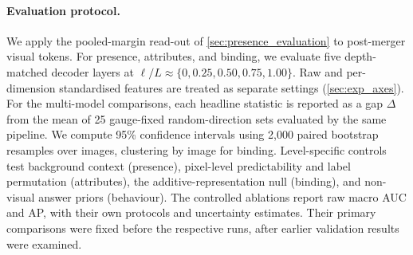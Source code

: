 \paragraph{Evaluation protocol.} We apply the pooled-margin read-out of
\cref{sec:presence_evaluation} to post-merger visual tokens. For presence,
attributes, and binding, we evaluate five depth-matched decoder layers at
$\ell/L\approx\{0,0.25,0.50,0.75,1.00\}$. Raw and per-dimension standardised
features are treated as separate settings (\cref{sec:exp_axes}). For the multi-model comparisons, each
headline statistic is reported as a gap $\Delta$ from the mean of 25
gauge-fixed random-direction sets evaluated by the same pipeline. We compute
95\% confidence intervals using 2,000 paired bootstrap resamples over images,
clustering by image for binding. Level-specific controls test background
context (presence), pixel-level predictability and label permutation
(attributes), the additive-representation null (binding), and non-visual
answer priors (behaviour). The controlled ablations report raw macro AUC and AP, with their own
protocols and uncertainty estimates. Their primary comparisons were fixed
before the respective runs, after earlier validation results were examined.


